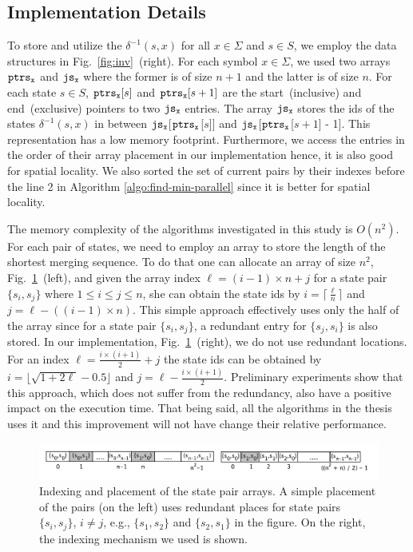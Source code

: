\documentclass[12pt]{article}
\begin{document}
\subsection{Implementation Details}\label{sec:implementation}
To store and utilize the  $\delta^{-1}(s,x)$ for all $x \in \Sigma$ and $s \in S$, we employ the data structures in Fig.~\ref{fig:inv}~(right). For each symbol $x \in \Sigma$, we used two arrays ${\tt ptrs_x}$ and ${\tt js_x}$ where the former is of size $n + 1$ and the latter is of size $n$. For each state $s \in S$, ${\tt ptrs_x}[s]$ and ${\tt ptrs_x}[s+1]$ are the start~(inclusive) and end~(exclusive) pointers to two ${\tt js_x}$ entries.  The array ${\tt js_x}$ stores the ids of the states $\delta^{-1}(s,x)$ in between ${\tt js_x}$[{$\tt ptrs_x$}[$s$]]  and ${\tt js_x}$[{$\tt ptrs_x$}[$s+1$] - 1]. This representation has a low memory footprint. Furthermore, we access the entries in the order of their array placement  in our implementation hence, it is also good for spatial locality. We also sorted the set of current pairs by their indexes before the line 2 in Algorithm \ref{algo:find-min-parallel} since it is better for spatial locality.

The memory complexity of the algorithms investigated in this study is $O(n^2)$. For each pair of states, we need to employ an array to store the length of the shortest merging sequence. To do that one can allocate an array of size $n^2$, Fig.~\ref{fig:mem}~(left), and given the array index $\ell = (i-1) \times n + j$ for a state pair $\{s_i, s_j\}$ where $1  \leq i \leq j \leq n$, she can obtain the state ids by $i = \lceil{\frac{\ell}{n}} \rceil$  and $j =\ell - ((i -1) \times n)$. This simple approach effectively uses only the half of the array since for a state pair $\{s_i, s_j\}$, a redundant entry for $\{s_j, s_i\}$ is also stored. In our implementation, Fig.~\ref{fig:mem}~(right), we do not use redundant locations. For an index  $\ell = \frac{i \times (i+1)}{2} + j$ the state ids can be obtained by $i = \lfloor \sqrt{1 + 2\ell} - 0.5\rfloor$ and $j = \ell - \frac{i \times (i+1)}{2}$. Preliminary experiments show that this approach, which does not suffer from the redundancy,  also have a positive impact on the execution time. That being said, all the algorithms in the thesis uses it and this improvement will not have change their relative performance.

\begin{figure}
	\centering
	\includegraphics[width=\textwidth]{figs/memory.pdf}
	\caption{Indexing and placement of the state pair arrays. A simple placement of the pairs (on the left) uses redundant places for state pairs $\{s_i, s_j\}$, $i \neq j$, e.g., $\{s_1, s_2\}$ and $\{s_2, s_1\}$ in the figure. On the right, the indexing mechanism we used is shown.}
	\label{fig:mem}
\end{figure}
\end{document}
